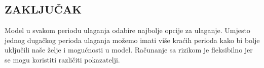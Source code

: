 \documentclass[9pt]{extarticle}
\begin{document}
\begin{multicols*}{2}
\section{\centering ZAKLJUČAK} \indentacija Model u svakom periodu ulaganja odabire najbolje opcije za ulaganje. 
Umjesto jednog dugačkog perioda ulaganja možemo imati više kraćih perioda kako bi bolje uključili naše želje i 
mogućnosti u model.
 Računanje sa rizikom je fleksibilno jer se mogu koristiti različiti pokazatelji.
\printbibliography \end{multicols*} 
\end{document}
